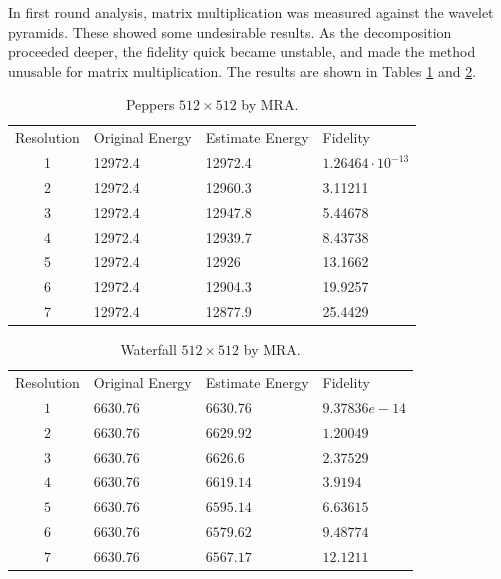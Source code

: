 In first round analysis, matrix multiplication was measured against the wavelet pyramids.  These showed some undesirable results.  As the decomposition proceeded deeper, the fidelity quick became unstable, and made the method unusable for matrix multiplication.  The results are shown in Tables \ref{tbl:peppers_mra} and \ref{tbl:waterfall_mra}.

\begin{table}\caption{\label{tbl:peppers_mra}
Peppers $512 \times 512$ by MRA.}
\begin{center}
\begin{tabular}{clll}
{Resolution} & { Original Energy } & { 
Estimate Energy }& { 
Fidelity } \\ 
1&  12972.4& 12972.4 &  $1.26464 \cdot 10^{-13} $ \\ 
2&12972.4  & 12960.3 &  3.11211  \\ 
3& 12972.4 &12947.8  &  5.44678  \\ 
4&12972.4&12939.7&   8.43738 \\
5 &12972.4  & 12926 & 13.1662 \\
6& 12972.4& 12904.3& 19.9257 \\
7& 12972.4 & 12877.9 & 25.4429 \\
\end{tabular}
\end{center}

\end{table}

\begin{table}\caption{\label{tbl:waterfall_mra}
Waterfall $512 \times 512$ by MRA.}
\begin{center}
\begin{tabular}{clll}
{Resolution} & { Original Energy }& { 
Estimate Energy } &  { 
Fidelity } \\ 
$1$&  $6630.76$ & $6630.76$&  $9.37836e-14$ \\ 
$2$& $6630.76$ & $6629.92$  &  $1.20049$ \\ 
$3$& $6630.76$ & $6626.6$   & $2.37529$ \\ 
$4$& $6630.76$ & $6619.14$  & $3.9194$ \\ 
$5$& $6630.76$ & $6595.14$  &  $6.63615$\\ 
$6$& $6630.76$ & $6579.62$  & $9.48774$ \\ 
$7$& $6630.76$ & $6567.17$  &  $12.1211$
\end{tabular}
\end{center}

\end{table}

